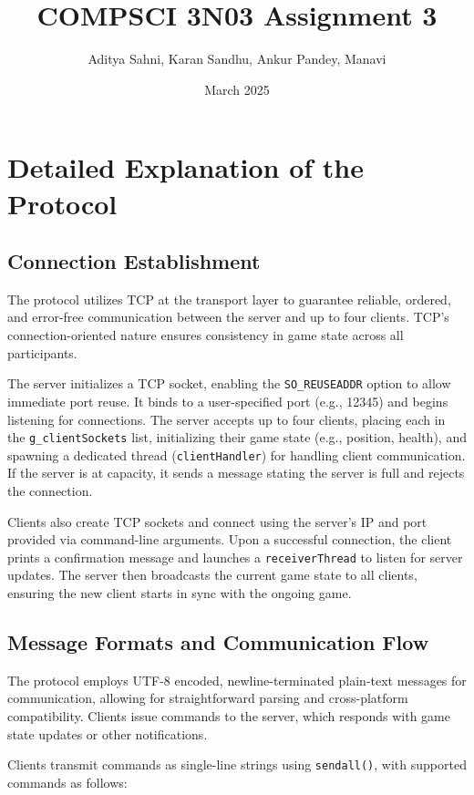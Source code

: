 \documentclass{article}
\title{COMPSCI 3N03 Assignment 3}
\author{Aditya Sahni, Karan Sandhu, Ankur Pandey, Manavi }
\date{March 2025}
\begin{document}
\maketitle

\section{Detailed Explanation of the Protocol}

\subsection{Connection Establishment}

The protocol utilizes TCP at the transport layer to guarantee reliable, ordered, and error-free communication between the server and up to four clients. TCP's connection-oriented nature ensures consistency in game state across all participants.

The server initializes a TCP socket, enabling the \texttt{SO\_REUSEADDR} option to allow immediate port reuse. It binds to a user-specified port (e.g., 12345) and begins listening for connections. The server accepts up to four clients, placing each in the \texttt{g\_clientSockets} list, initializing their game state (e.g., position, health), and spawning a dedicated thread (\texttt{clientHandler}) for handling client communication. If the server is at capacity, it sends a message stating the server is full and rejects the connection.

Clients also create TCP sockets and connect using the server's IP and port provided via command-line arguments. Upon a successful connection, the client prints a confirmation message and launches a \texttt{receiverThread} to listen for server updates. The server then broadcasts the current game state to all clients, ensuring the new client starts in sync with the ongoing game.

\subsection{Message Formats and Communication Flow}

The protocol employs UTF-8 encoded, newline-terminated plain-text messages for communication, allowing for straightforward parsing and cross-platform compatibility. Clients issue commands to the server, which responds with game state updates or other notifications.

Clients transmit commands as single-line strings using \texttt{sendall()}, with supported commands as follows:
\end{document}

